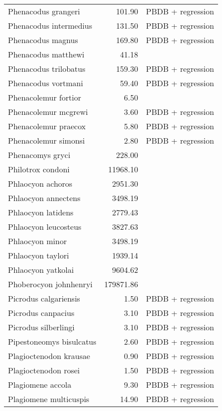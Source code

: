 \begin{table}[ht]
\begin{tabular}{lrl}
  Phenacodus grangeri & 101.90 & PBDB + regression \\ 
  Phenacodus intermedius & 131.50 & PBDB + regression \\ 
  Phenacodus magnus & 169.80 & PBDB + regression \\ 
  Phenacodus matthewi & 41.18 & \cite{Cope1871} \\ 
  Phenacodus trilobatus & 159.30 & PBDB + regression \\ 
  Phenacodus vortmani & 59.40 & PBDB + regression \\ 
  Phenacolemur fortior & 6.50 & \cite{Wood1962} \\ 
  Phenacolemur mcgrewi & 3.60 & PBDB + regression \\ 
  Phenacolemur praecox & 5.80 & PBDB + regression \\ 
  Phenacolemur simonsi & 2.80 & PBDB + regression \\ 
  Phenacomys gryci & 228.00 & \cite{McKenna2011} \\ 
  Philotrox condoni & 11968.10 & \cite{Tomiya2013} \\ 
  Phlaocyon achoros & 2951.30 & \cite{Tomiya2013} \\ 
  Phlaocyon annectens & 3498.19 & \cite{Tomiya2013} \\ 
  Phlaocyon latidens & 2779.43 & \cite{Tomiya2013} \\ 
  Phlaocyon leucosteus & 3827.63 & \cite{Tomiya2013} \\ 
  Phlaocyon minor & 3498.19 & \cite{Tomiya2013} \\ 
  Phlaocyon taylori & 1939.14 & \cite{Tomiya2013} \\ 
  Phlaocyon yatkolai & 9604.62 & \cite{Tomiya2013} \\ 
  Phoberocyon johnhenryi & 179871.86 & \cite{Tomiya2013} \\ 
  Picrodus calgariensis & 1.50 & PBDB + regression \\ 
  Picrodus canpacius & 3.10 & PBDB + regression \\ 
  Picrodus silberlingi & 3.10 & PBDB + regression \\ 
  Pipestoneomys bisulcatus & 2.60 & PBDB + regression \\ 
  Plagioctenodon krausae & 0.90 & PBDB + regression \\ 
  Plagioctenodon rosei & 1.50 & PBDB + regression \\ 
  Plagiomene accola & 9.30 & PBDB + regression \\ 
  Plagiomene multicuspis & 14.90 & PBDB + regression \\ 

\end{tabular}
\end{table}
